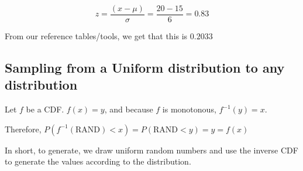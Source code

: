 \documentclass[a4paper]{article}
\begin{document}
\[z=\frac{(x-\mu)}{\sigma}=\frac{20-15}{6}=0.83\]

From our reference tables/tools, we get that this is $0.2033$

\subsection{Sampling from a Uniform distribution to any distribution}

Let $f$ be a CDF. $f(x)=y$, and because $f$ is monotonous, $f^{-1}(y)=x$.

Therefore, $P(f^{-1}(\text{RAND})<x)=P(\text{RAND}<y)=y=f(x)$

In short, to generate, we draw uniform random numbers and use the inverse CDF to generate the values according to the distribution.

\subsection{}
\end{document}
